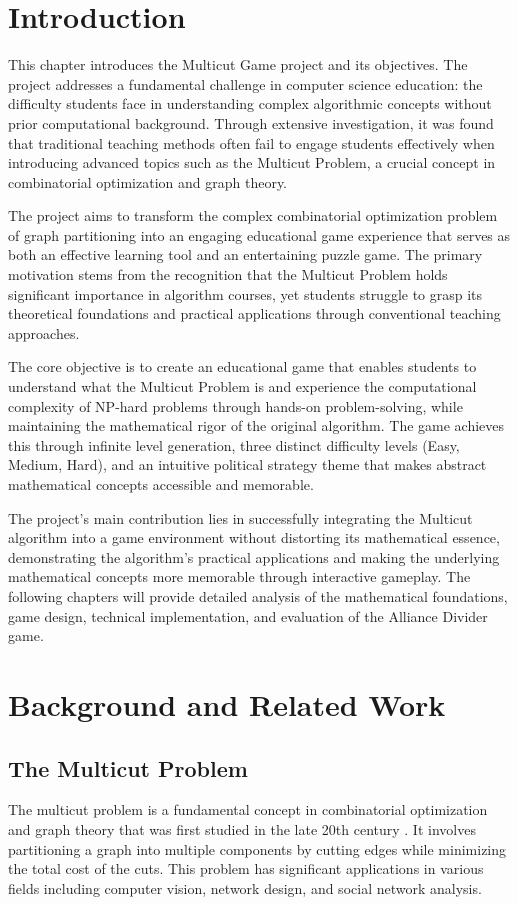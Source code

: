 \documentclass[english]{tudscrreprt}
\begin{document}
\chapter{Introduction}

This chapter introduces the Multicut Game project and its objectives. The project addresses a fundamental challenge in computer science education: the difficulty students face in understanding complex algorithmic concepts without prior computational background. Through extensive investigation, it was found that traditional teaching methods often fail to engage students effectively when introducing advanced topics such as the Multicut Problem, a crucial concept in combinatorial optimization and graph theory.

The project aims to transform the complex combinatorial optimization problem of graph partitioning into an engaging educational game experience that serves as both an effective learning tool and an entertaining puzzle game. The primary motivation stems from the recognition that the Multicut Problem holds significant importance in algorithm courses, yet students struggle to grasp its theoretical foundations and practical applications through conventional teaching approaches.

The core objective is to create an educational game that enables students to understand what the Multicut Problem is and experience the computational complexity of NP-hard problems through hands-on problem-solving, while maintaining the mathematical rigor of the original algorithm. The game achieves this through infinite level generation, three distinct difficulty levels (Easy, Medium, Hard), and an intuitive political strategy theme that makes abstract mathematical concepts accessible and memorable.

The project's main contribution lies in successfully integrating the Multicut algorithm into a game environment without distorting its mathematical essence, demonstrating the algorithm's practical applications and making the underlying mathematical concepts more memorable through interactive gameplay. The following chapters will provide detailed analysis of the mathematical foundations, game design, technical implementation, and evaluation of the Alliance Divider game.

\chapter{Background and Related Work}

\section{The Multicut Problem}
The multicut problem is a fundamental concept in combinatorial optimization and graph theory that was first studied in the late 20th century \cite{bansal2004}. It involves partitioning a graph into multiple components by cutting edges while minimizing the total cost of the cuts. This problem has significant applications in various fields including computer vision, network design, and social network analysis.
\end{document}
